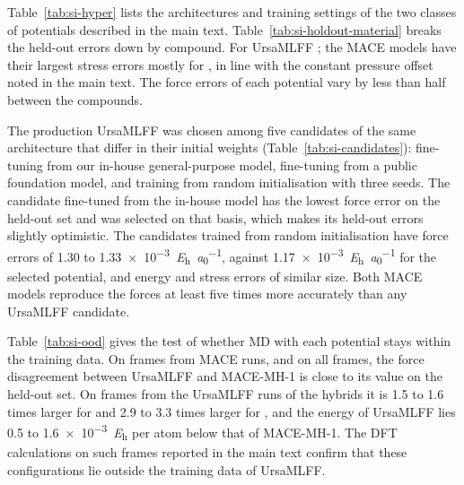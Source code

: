 Table~\ref{tab:si-hyper} lists the architectures and training settings of the two classes of
potentials described in the main text. Table~\ref{tab:si-holdout-material} breaks the held-out errors
down by compound. For UrsaMLFF ; the MACE models have their largest
stress errors mostly for \CsSnI{}, in line with the constant pressure offset noted in the main text.
The force errors of each potential vary by less than half between the compounds.

The production UrsaMLFF was chosen among five candidates of the same architecture that differ in
their initial weights (Table~\ref{tab:si-candidates}): fine-tuning from our in-house general-purpose
model, fine-tuning from a public foundation model, and training from random initialisation with three
seeds. The candidate fine-tuned from the in-house model has the lowest force error on the held-out
set and was selected on that basis, which makes its held-out errors slightly optimistic. The
candidates trained from random initialisation have force errors of 1.30 to
\SI{1.33e-3}{\hartree\per\bohr}, against \SI{1.17e-3}{\hartree\per\bohr} for the selected
potential, and energy and stress errors of similar size. Both MACE models reproduce the forces at
least five times more accurately than any UrsaMLFF candidate.

Table~\ref{tab:si-ood} gives the test of whether MD with each potential stays within the training
data. On frames from MACE runs, and on all \CsSnI{} frames, the force disagreement between UrsaMLFF and
MACE-MH-1 is close to its value on the held-out set. On frames from the UrsaMLFF runs of the hybrids it
is 1.5 to 1.6 times larger for \MASnI{} and 2.9 to 3.3 times larger for \FASnI{}, and the energy of
UrsaMLFF lies 0.5 to \SI{1.6e-3}{\hartree} per atom below that of MACE-MH-1. The DFT calculations on
such frames reported in the main text confirm that these configurations lie outside the training data
of UrsaMLFF.

